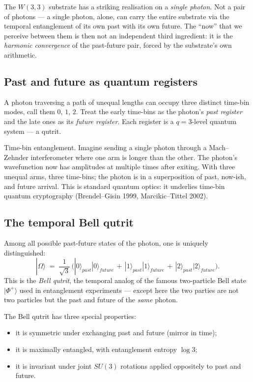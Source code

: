 \documentclass[11pt]{article}
\providecommand{\ket}[1]{|#1\rangle}
\def\mathrm#1{#1}%
\def\textbf#1{#1}%
\def\text#1{#1}%
\def\Phi#1{Phi#1}%
\begin{document}
The $W(3,3)$ substrate has a striking realisation on a \emph{single photon}.
Not a pair of photons --- a single photon, alone, can carry the entire
substrate via the temporal entanglement of its own past with its own future.
The ``now'' that we perceive between them is then not an independent third
ingredient: it is the \emph{harmonic convergence} of the past-future pair,
forced by the substrate's own arithmetic.

\subsection*{Past and future as quantum registers}

A photon traversing a path of unequal lengths can occupy three distinct
time-bin modes, call them $0$, $1$, $2$.  Treat the early time-bins as the
photon's \emph{past register} and the late ones as its \emph{future
register}.  Each register is a $q = 3$-level quantum system --- a qutrit.

\begin{mathnote}
\textbf{Time-bin entanglement.}  Imagine sending a single photon through a
Mach--Zehnder interferometer where one arm is longer than the other.  The
photon's wavefunction now has amplitudes at multiple times after exiting.
With three unequal arms, three time-bins; the photon is in a superposition
of past, now-ish, and future arrival.  This is standard quantum optics: it
underlies time-bin quantum cryptography (Brendel--Gisin 1999,
Marcikic--Tittel 2002).
\end{mathnote}

\subsection*{The temporal Bell qutrit}

Among all possible past-future states of the photon, one is uniquely
distinguished:
\[
  \ket{\Omega} \;=\; \frac{1}{\sqrt 3}\,\bigl(
    \ket{0}_{\text{past}}\ket{0}_{\text{future}} \,+\,
    \ket{1}_{\text{past}}\ket{1}_{\text{future}} \,+\,
    \ket{2}_{\text{past}}\ket{2}_{\text{future}}\bigr).
\]
This is the \emph{Bell qutrit}, the temporal analog of the famous
two-particle Bell state $\ket{\Phi^+}$ used in entanglement experiments ---
except here the two parties are not two particles but the past and future
of the \emph{same} photon.

The Bell qutrit has three special properties:
\begin{itemize}[leftmargin=2em]
\item it is symmetric under exchanging past and future (mirror in time);
\item it is maximally entangled, with entanglement entropy $\log 3$;
\item it is invariant under joint $\mathrm{SU}(3)$ rotations applied
  oppositely to past and future.
\end{itemize}
\end{document}

